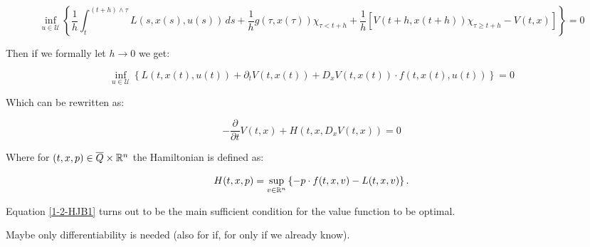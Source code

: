 \begin{equation}
    \inf_{u\in\mathcal{U}}\left\{\frac{1}{h}\int_t^{(t+h)\land\tau} L(s,x(s),u(s))\,ds + \frac{1}{h}g(\tau,x(\tau))\chi_{\tau<t+h} + \frac{1}{h}\left[V(t+h,x(t+h))\chi_{\tau\geq t+h} - V(t,x)\right]\right\}=0
\end{equation}

Then if we formally let $h\to0$ we get:

\[\inf_{u\in\mathcal{U}}\left\{L(t,x(t),u(t)) + \partial_tV(t,x(t)) + D_xV(t,x(t))\cdot f(t,x(t),u(t))\right\}=0\]

Which can be rewritten as:

\begin{equation}\label{1-2-HJB1}
    -\frac{\partial}{\partial t}V(t,x) + H(t,x,D_xV(t,x))=0
\end{equation}

Where for $(t,x,p)\in \overline{Q}\times\mathbb{R}^n$ the Hamiltonian is defined as:

\begin{equation}\label{1-2-Hamiltonian1}
    H(t,x,p) = \sup_{v\in\mathbb{R}^n}\left\{-p\cdot f(t,x,v) - L(t,x,v)\right\}.
\end{equation}

Equation \ref{1-2-HJB1} turns out to be the main sufficient condition for the value function to be optimal.

Maybe only differentiability is needed (also for if, for only if we already know).

